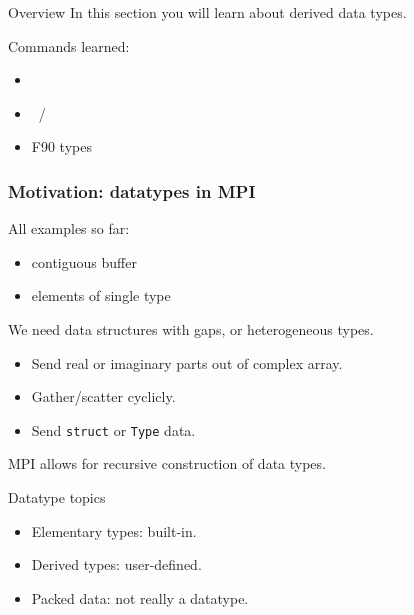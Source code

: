 
\begin{frame}[containsverbatim]{Overview}
  In this section you will learn about derived data types.

  Commands learned:
  \begin{itemize}
  \item {}
  \item {}~/ 
  \item F90 types
  \end{itemize}
\end{frame}


\begin{frame}[containsverbatim]\frametitle{Motivation: datatypes in MPI}
  All examples so far: 
  \begin{itemize}
  \item contiguous buffer
  \item elements of single type
  \end{itemize}
  We need data structures with gaps, or heterogeneous types.
  \begin{itemize}
  \item Send real or imaginary parts out of complex array.
  \item Gather/scatter cyclicly.
  \item Send \lstinline{struct} or \lstinline{Type} data.
  \end{itemize}
  MPI allows for recursive construction of data types.
\end{frame}

\begin{frame}{Datatype topics}
  \begin{itemize}
  \item Elementary types: built-in.
  \item Derived types: user-defined.
  \item Packed data: not really a datatype.
  \end{itemize}
\end{frame}

